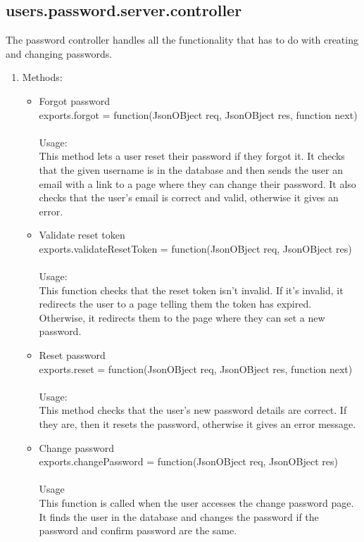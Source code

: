 \documentclass[a4paper,12pt]{article}
\begin{document}
\subsection{users.password.server.controller}
 The password controller handles all the functionality that has to do with creating and changing passwords.
\begin{enumerate}
\item Methods:
	\begin{itemize}
	\item Forgot password\\ exports.forgot = function(JsonOBject req, JsonOBject res, function next)\\ \\
  	Usage: \\
  	This method lets a user reset their password if they forgot it. It checks that the given username is in the database and then sends the user an email with a link to a page where they can change their password. It also checks that the user's email is correct and valid, otherwise it gives an error.
	\item Validate reset token\\ exports.validateResetToken = function(JsonOBject req, JsonOBject res) \\ \\
	Usage: \\
	This function checks that the reset token isn't invalid. If it's invalid, it redirects the user to a page telling them the token has expired. Otherwise, it redirects them to the page where they can set a new password.
	\item Reset password\\ exports.reset = function(JsonOBject req, JsonOBject res, function next)\\  \\
	Usage: \\
	This method checks that the user's new password details are correct. If they are, then it resets the password, otherwise it gives an error message.
 	 \item Change password\\ exports.changePassword = function(JsonOBject req, JsonOBject res)\\ \\
 	 Usage\\ 
  	This function is called when the user accesses the change password page. It finds the user in the database and changes the password if the password and confirm password are the same.
	\end{itemize}
\end{enumerate} 
\end{document}
